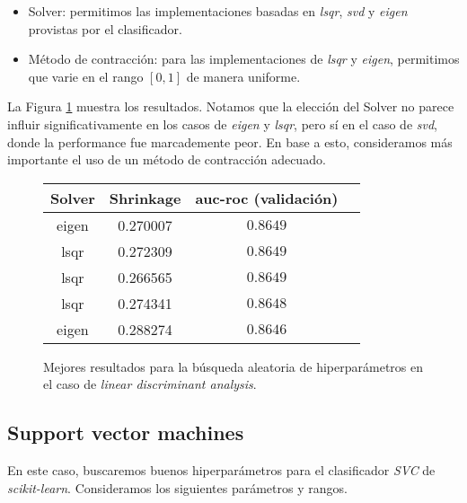 \begin{itemize}
    \item Solver: permitimos las implementaciones basadas en \textit{lsqr}, \textit{svd} y \textit{eigen} provistas por el clasificador.
    \item Método de contracción: para las implementaciones de \textit{lsqr} y \textit{eigen}, permitimos que varie en el rango $[0, 1]$ de manera uniforme.
\end{itemize}


La Figura \ref{lda} muestra los resultados. Notamos que la elección del Solver no parece influir significativamente en los casos de \textit{eigen} y \textit{lsqr}, pero sí en el caso de \textit{svd}, donde la performance fue marcademente peor. En base a esto, consideramos más importante el uso de un método de contracción adecuado.

\vspace{0.5em}
\begin{figure}[!htbp]
    \begin{center}
        \begin{tabular}{ |c|c|c|c| } 
         \hline
        Solver   & Shrinkage & auc-roc (validación) \\
        \hline
        eigen                   &  0.270007          & $0.8649$  \\ 
        lsqr                    &  0.272309          & $0.8649$  \\
        lsqr                    &  0.266565          & $0.8649$  \\ 
        lsqr                    &  0.274341          & $0.8648$  \\
        eigen                   &  0.288274          & $0.8646$  \\ 
        \hline
        \end{tabular}
    \end{center}
    \caption{Mejores resultados para la búsqueda aleatoria de hiperparámetros en el caso de \textit{linear discriminant analysis}.} \label{lda}
\end{figure}

\subsection{Support vector machines} En este caso, buscaremos buenos hiperparámetros para el clasificador \textit{SVC} de \textit{scikit-learn}. Consideramos los siguientes parámetros y rangos. 

